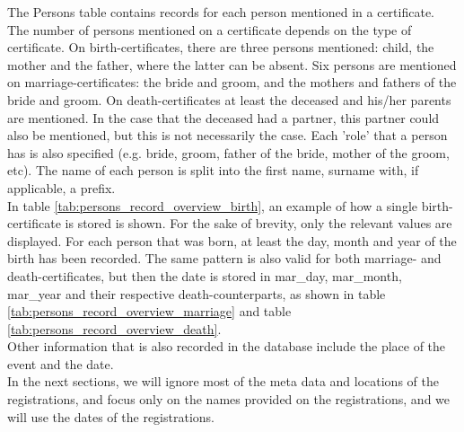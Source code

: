 The Persons table contains records for each person mentioned in a certificate. The number of persons mentioned on a certificate depends on the type of certificate. On birth-certificates, there are three persons mentioned: child, the mother and the father, where the latter can be absent. Six persons are mentioned on marriage-certificates: the bride and groom, and the mothers and fathers of the bride and groom. On death-certificates at least the deceased and his/her parents are mentioned. In the case that the deceased had a partner, this partner could also be mentioned, but this is not necessarily the case. 
Each 'role' that a person has is also specified (e.g. bride, groom, father of the bride, mother of the groom, etc). The name of each person is split into the first name, surname with, if applicable, a prefix.\\

In table \ref{tab:persons_record_overview_birth}, an example of how a single birth-certificate is stored is shown. For the sake of brevity, only the relevant values are displayed. For each person that was born, at least the day, month and year of the birth has been recorded. The same pattern is also valid for both marriage- and death-certificates, but then the date is stored in mar\_day, mar\_month, mar\_year and their respective death-counterparts, as shown in table \ref{tab:persons_record_overview_marriage} and table \ref{tab:persons_record_overview_death}.\\

Other information that is also recorded in the database include the place of the event and the date. \\
In the next sections, we will ignore most of the meta data and locations of the registrations, and focus only on the names provided on the registrations, and we will use the dates of the registrations.


